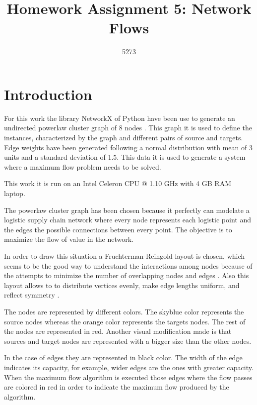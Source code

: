 \documentclass[10pt,a4paper,openany]{article}
\author{5273}
\title{Homework Assignment 5: Network Flows}
\date{}
\begin{document}
	
\maketitle

	\section*{Introduction}
	
	For this work the library NetworkX of Python have been use to generate an undirected powerlaw cluster graph of 8 nodes \citep{networkx}. This graph it is used to define the instances, characterized by the graph and different pairs of source and targets. Edge weights have been generated following a normal distribution with mean of 3 units and a standard deviation of 1.5. This data it is used to generate a system where a maximum flow problem needs to be solved.

	
	This work it is run on an Intel Celeron CPU $ @ $ 1.10 GHz with 4 GB RAM laptop.
	
	
	The powerlaw cluster graph has been chosen because it perfectly can modelate a logistic supply chain network where every node represents each logistic point and the edges the possible connections between every point\citep{gallo1989fast}. The objective is to maximize the flow of value in the network\citep{erdos1959graph}.
	
	In order to draw this situation a Fruchterman-Reingold layout is chosen, which seems to be the good way to understand the interactions among nodes because of the attempts to minimize the number of overlapping nodes and edges \citep{tsay2010hierarchically}. Also this layout allows to to distribute vertices evenly, make edge lengths uniform, and reflect symmetry \citep{fruchterman1991graph}.

	The nodes are represented by different colors. The skyblue color represents the source nodes whereas the orange color represents the targets nodes. The rest of the nodes are represented in red. Another visual modification made is that sources and target nodes are represented with a bigger size than the other nodes. 
	
	In the case of edges they are represented in black color. The width of the edge indicates its capacity, for example, wider edges are the ones with greater capacity. When the maximum flow algorithm is executed those edges where the flow passes are colored in red in order to indicate the maximum flow produced by the algorithm.
	
\end{document}
